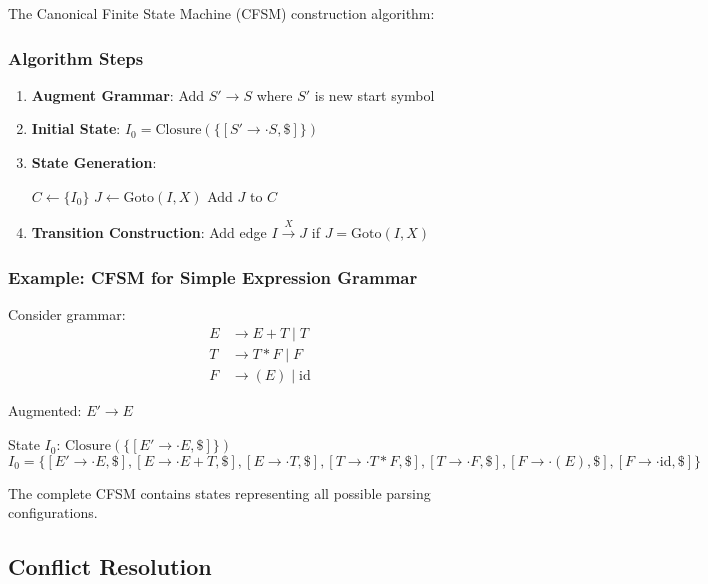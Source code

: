 The Canonical Finite State Machine (CFSM) construction algorithm:

\subsubsection{Algorithm Steps}
\begin{enumerate}
    \item \textbf{Augment Grammar}: Add $S' \to S$ where $S'$ is new start symbol
    \item \textbf{Initial State}: $I_0 = \text{Closure}(\{[S' \to \cdot S, \$]\})$
    \item \textbf{State Generation}:
        \begin{algorithmic}
        \State $C \gets \{I_0\}$
        \Repeat
                    \State $J \gets \text{Goto}(I, X)$
                        \State Add $J$ to $C$
                    \EndIf
                \EndFor
            \EndFor
        \end{algorithmic}
    \item \textbf{Transition Construction}: Add edge $I \xrightarrow{X} J$ if $J = \text{Goto}(I, X)$
\end{enumerate}

\subsubsection{Example: CFSM for Simple Expression Grammar}
Consider grammar:
\begin{align}
E &\to E + T \mid T \\
T &\to T * F \mid F \\
F &\to (E) \mid \text{id}
\end{align}

Augmented: $E' \to E$

State $I_0$: $\text{Closure}(\{[E' \to \cdot E, \$]\})$
$$I_0 = \{[E' \to \cdot E, \$], [E \to \cdot E + T, \$], [E \to \cdot T, \$], [T \to \cdot T * F, \$], [T \to \cdot F, \$], [F \to \cdot (E), \$], [F \to \cdot \text{id}, \$]\}$$

The complete CFSM contains states representing all possible parsing configurations.

\subsection{Conflict Resolution}

